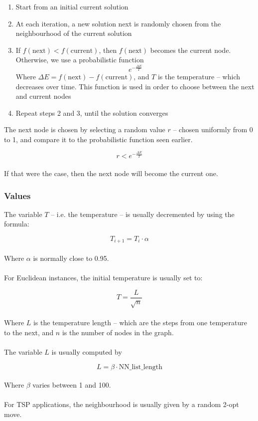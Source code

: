 \documentclass{article}
\begin{document}
\begin{enumerate}
	\item Start from an initial current solution
	\item At each iteration, a new solution next is randomly chosen from the neighbourhood of the current solution
	\item If $f(\text{next}) < f(\text{current})$, then $f(\text{next})$ becomes the current node. Otherwise, we use a probabilistic function
	\[ e^{-\frac{\Delta E}{T}} \]
	Where $\Delta E = f(\text{next}) - f(\text{current})$, and $T$ is the temperature -- which decreases over time. This function is used in order to choose between the next and current nodes
	\item Repeat steps 2 and 3, until the solution converges
\end{enumerate}
The next node is chosen by selecting a random value $r$ -- chosen uniformly from 0 to 1, and compare it to the probabilistic function seen earlier.

\[ r < e^{-\frac{\Delta E}{T}} \] \\
If that were the case, then the next node will become the current one.

\subsubsection{Values}
The variable $T$ -- i.e. the temperature -- is usually decremented by using the formula:

\[ T_{i + 1} = T_i \cdot \alpha \] \\
Where $\alpha$ is normally close to 0.95. \\ \\
For Euclidean instances, the initial temperature is usually set to:

\[ T = \frac{L}{\sqrt{n}} \] \\
Where $L$ is the temperature length -- which are the steps from one temperature to the next, and $n$ is the number of nodes in the graph. \\ \\
The variable $L$ is usually computed by

\[ L = \beta \cdot \text{NN\_list\_length} \] \\
Where $\beta$ varies between 1 and 100. \\ \\
For TSP applications, the neighbourhood is usually given by a random 2-opt move.
\end{document}
